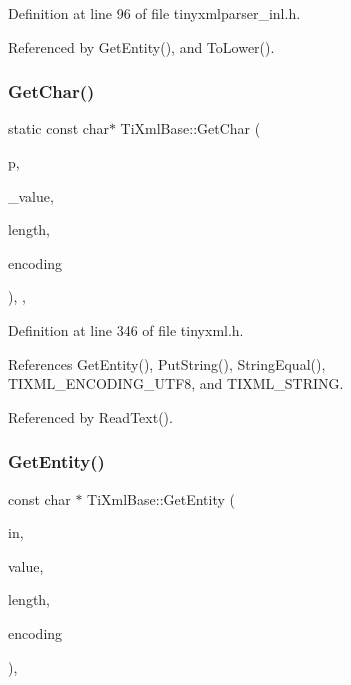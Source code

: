 Definition at line 96 of file tinyxmlparser\+\_\+inl.\+h.



Referenced by Get\+Entity(), and To\+Lower().

\hypertarget{class_ti_xml_base_a5b0fde72d6f662ae1fd6303195d2159b}{}\label{class_ti_xml_base_a5b0fde72d6f662ae1fd6303195d2159b} 
\subsubsection{\texorpdfstring{Get\+Char()}{GetChar()}}
{\footnotesize\ttfamily static const char$\ast$ Ti\+Xml\+Base\+::\+Get\+Char (\begin{DoxyParamCaption}\item[{const char $\ast$}]{p,  }\item[{char $\ast$}]{\+\_\+value,  }\item[{int $\ast$}]{length,  }\item[{\hyperlink{tinyxml_8h_a88d51847a13ee0f4b4d320d03d2c4d96}{Ti\+Xml\+Encoding}}]{encoding }\end{DoxyParamCaption})\hspace{0.3cm}{\ttfamily [inline]}, {\ttfamily [static]}, {\ttfamily [protected]}}



Definition at line 346 of file tinyxml.\+h.



References Get\+Entity(), Put\+String(), String\+Equal(), T\+I\+X\+M\+L\+\_\+\+E\+N\+C\+O\+D\+I\+N\+G\+\_\+\+U\+T\+F8, and T\+I\+X\+M\+L\+\_\+\+S\+T\+R\+I\+NG.



Referenced by Read\+Text().

\hypertarget{class_ti_xml_base_ac5c08bf3deffcda0bf8ce2958372b584}{}\label{class_ti_xml_base_ac5c08bf3deffcda0bf8ce2958372b584} 
\subsubsection{\texorpdfstring{Get\+Entity()}{GetEntity()}}
{\footnotesize\ttfamily const char $\ast$ Ti\+Xml\+Base\+::\+Get\+Entity (\begin{DoxyParamCaption}\item[{const char $\ast$}]{in,  }\item[{char $\ast$}]{value,  }\item[{int $\ast$}]{length,  }\item[{\hyperlink{tinyxml_8h_a88d51847a13ee0f4b4d320d03d2c4d96}{Ti\+Xml\+Encoding}}]{encoding }\end{DoxyParamCaption})\hspace{0.3cm}{\ttfamily [static]}, {\ttfamily [protected]}}



